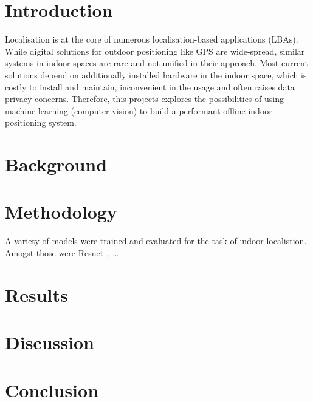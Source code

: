 \documentclass{article}
\begin{document}
  
  \newpage

  \tableofcontents
  \listoftables
  \listoffigures
  \newpage

  \begin{abstract} %
    \lipsum[1]
  \end{abstract}

  \section{Introduction}
  \label{sec:introduction}

  Localisation is at the core of numerous localisation-based applications
  (LBAs). While digital solutions for outdoor positioning like GPS are
  wide-spread, similar systems in indoor spaces are rare and not unified in
  their approach. Most current solutions depend on additionally installed
  hardware in the indoor space, which is costly to install and maintain,
  inconvenient in the usage and often raises data privacy concerns. Therefore,
  this projects explores the possibilities of using machine learning (computer
  vision) to build a performant offline indoor positioning system.


  \section{Background} %
  \label{sec:background}


  \section{Methodology} %
  \label{sec:methodology}

  A variety of models were trained and evaluated for the task of indoor
  localistion. Amogst those were Resnet~\cite{resnet}, \ldots


  \section{Results} %
  \label{sec:results}


  \section{Discussion} %
  \label{sec:discussion}


  \section{Conclusion} %
  \label{sec:conclusion}


  \newpage
  
  
\end{document}
